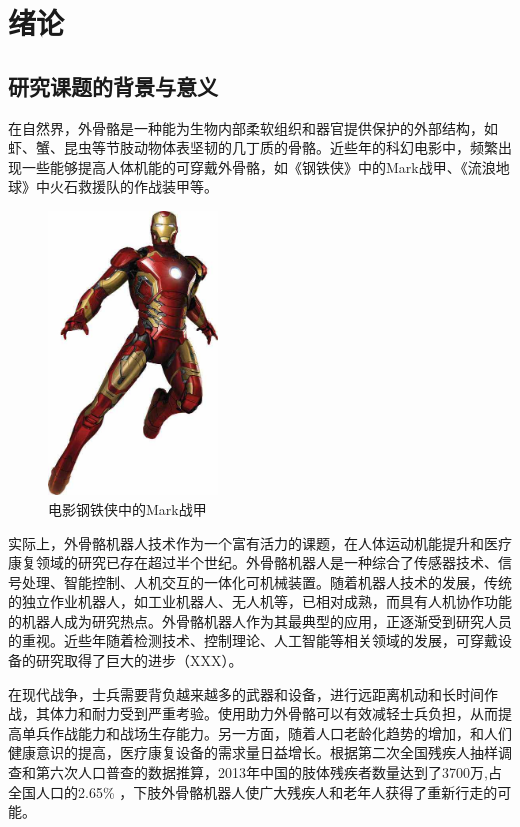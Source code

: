 \chapter{绪论}
\section{研究课题的背景与意义}
在自然界，外骨骼是一种能为生物内部柔软组织和器官提供保护的外部结构，如虾、蟹、昆虫等节肢动物体表坚韧的几丁质的骨骼。近些年的科幻电影中，频繁出现一些能够提高人体机能的可穿戴外骨骼，如《钢铁侠》中的Mark战甲、《流浪地球》中火石救援队的作战装甲等。

\begin{figure}[htb]
    \includegraphics[width=4.5cm]{fig/f2.jpg}
    \caption{电影钢铁侠中的Mark战甲}
    \label{fig:mark}
\end{figure}

实际上，外骨骼机器人技术作为一个富有活力的课题，在人体运动机能提升\cite{p1}和医疗康复\cite{p2}领域的研究已存在超过半个世纪。外骨骼机器人是一种综合了传感器技术、信号处理、智能控制、人机交互的一体化可机械装置。随着机器人技术的发展，传统的独立作业机器人，如工业机器人、无人机等，已相对成熟，而具有人机协作功能的机器人成为研究热点。外骨骼机器人作为其最典型的应用，正逐渐受到研究人员的重视。近些年随着检测技术、控制理论、人工智能等相关领域的发展，可穿戴设备的研究取得了巨大的进步（XXX）。

在现代战争，士兵需要背负越来越多的武器和设备，进行远距离机动和长时间作战，其体力和耐力受到严重考验。使用助力外骨骼可以有效减轻士兵负担，从而提高单兵作战能力和战场生存能力。另一方面，随着人口老龄化趋势的增加，和人们健康意识的提高，医疗康复设备的需求量日益增长。根据第二次全国残疾人抽样调查和第六次人口普查的数据推算，2013年中国的肢体残疾者数量达到了3700万,占全国人口的2.65\% \cite{p3}，下肢外骨骼机器人使广大残疾人和老年人获得了重新行走的可能。

